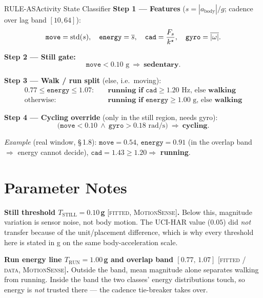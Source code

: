 \begin{rulebox}{RULE-AS}{Activity State Classifier}
\textbf{Step 1 --- Features} ($s = |a_\text{body}|/g$; cadence over lag band $[10,64]$):
\[ \texttt{move}=\operatorname{std}(s),\quad \texttt{energy}=\overline{s},\quad
   \texttt{cad}=\frac{F_s}{k^\star},\quad \texttt{gyro}=\overline{|\omega|}. \]

\textbf{Step 2 --- Still gate:}
\[ \texttt{move} < 0.10\text{ g} \ \Rightarrow\ \textbf{sedentary}. \]

\textbf{Step 3 --- Walk / run split} (else, i.e.\ moving):
\[
\begin{aligned}
0.77 \leq \texttt{energy} \leq 1.07:\quad
   &\textbf{running if } \texttt{cad}\geq 1.20\text{ Hz, else } \textbf{walking}\\
\text{otherwise}:\quad
   &\textbf{running if } \texttt{energy}\geq 1.00\text{ g, else } \textbf{walking}
\end{aligned}
\]

\textbf{Step 4 --- Cycling override} (only in the still region, needs gyro):
\[ \big(\texttt{move} < 0.10 \ \wedge\ \texttt{gyro} > 0.18\text{ rad/s}\big)\ \Rightarrow\ \textbf{cycling}. \]


\smallskip
\textit{Example} (real window, \S\,1.8): $\texttt{move}=0.54$, $\texttt{energy}=0.91$ (in
the overlap band $\Rightarrow$ energy cannot decide), $\texttt{cad}=1.43\geq1.20\Rightarrow$
\textbf{running}.
\end{rulebox}

\section{Parameter Notes}

\noindent\textbf{Still threshold $T_\text{STILL}=0.10$\,g} {\footnotesize\textsc{[fitted, MotionSense]}}\textbf{.}
Below this, magnitude variation is sensor noise, not body motion. The UCI-HAR value
($0.05$) did \emph{not} transfer because of the unit/placement difference, which is why every
threshold here is stated in g on the same body-acceleration scale.

\noindent\textbf{Run energy line $T_\text{RUN}=1.00$\,g and overlap band $[0.77,\,1.07]$}
{\footnotesize\textsc{[fitted / data, MotionSense]}}\textbf{.}
Outside the band, mean magnitude alone separates walking from running. Inside the band the
two classes' energy distributions touch, so energy is \emph{not} trusted there --- the
cadence tie-breaker takes over.

